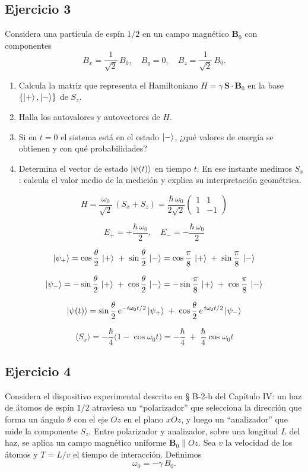 \documentclass[a4paper,11pt]{article}
\begin{document}
\subsection*{Ejercicio 3}
Considera una partícula de espín $1/2$ en un campo magnético $\mathbf{B}_0$ con componentes
\[
  B_x=\frac{1}{\sqrt{2}}\,B_0,\quad B_y=0,\quad B_z=\frac{1}{\sqrt{2}}\,B_0.
\]
\begin{enumerate}
  \item Calcula la matriz que representa el Hamiltoniano $H=\gamma\,\mathbf{S}\cdot\mathbf{B}_0$ en la base $\{\ket{+},\ket{-}\}$ de $S_z$.
  \item Halla los autovalores y autovectores de $H$.
  \item Si en $t=0$ el sistema está en el estado $\ket{-}$, ¿qué valores de energía se obtienen y con qué probabilidades?
  \item Determina el vector de estado $\ket{\psi(t)}$ en tiempo $t$. En ese instante medimos $S_x$: calcula el valor medio de la medición y explica su interpretación geométrica.
\end{enumerate}
$$H = \frac{\omega_0}{\sqrt{2}}\,(S_x + S_z)
  = \frac{\hbar\,\omega_0}{2\sqrt{2}}
    \begin{pmatrix}
      1 & 1\\
      1 & -1
    \end{pmatrix}$$


$$E_{+} = +\frac{\hbar\,\omega_0}{2},\quad
E_{-} = -\frac{\hbar\,\omega_0}{2}$$

$$\ket{\psi_{+}}
  = \cos\frac{\theta}{2}\,\ket{+} \;+\; \sin\frac{\theta}{2}\,\ket{-}
  = \cos\frac{\pi}{8}\,\ket{+} \;+\; \sin\frac{\pi}{8}\,\ket{-}$$

$$\ket{\psi_{-}}
  = -\sin\frac{\theta}{2}\,\ket{+} \;+\; \cos\frac{\theta}{2}\,\ket{-}
  = -\sin\frac{\pi}{8}\,\ket{+} \;+\; \cos\frac{\pi}{8}\,\ket{-}$$

$$\ket{\psi(t)}
  = \sin\frac{\theta}{2}\,e^{-i\omega_0 t/2}\ket{\psi_{+}}
  \;+\; \cos\frac{\theta}{2}\,e^{\,i\omega_0 t/2}\ket{\psi_{-}}$$


$$\langle S_x\rangle
  = -\frac{\hbar}{4}\bigl(1-\cos\omega_0 t\bigr)
  = -\frac{\hbar}{4} \;+\; \frac{\hbar}{4}\cos\omega_0 t$$

\subsection*{Ejercicio 4}
Considera el dispositivo experimental descrito en § B-2-b del Capítulo IV: un haz de átomos de espín \(1/2\) atraviesa un “polarizador” que selecciona la dirección que forma un ángulo \(\theta\) con el eje \(Oz\) en el plano \(xOz\), y luego un “analizador” que mide la componente \(S_z\). Entre polarizador y analizador, sobre una longitud \(L\) del haz, se aplica un campo magnético uniforme \(\mathbf{B}_0\parallel Oz\). Sea \(v\) la velocidad de los átomos y \(T=L/v\) el tiempo de interacción. Definimos
\[
\omega_0 = -\gamma\,B_0.
\]
\end{document}
